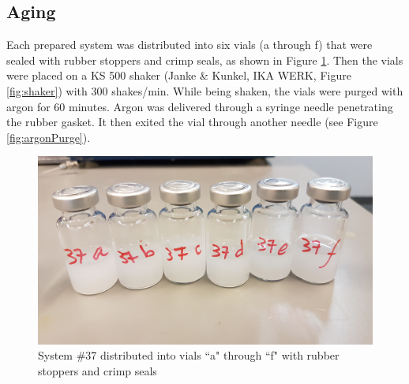 \subsection{Aging}
Each prepared system was distributed into six vials (a through f) that were sealed with rubber stoppers and crimp seals, as shown in Figure \ref{fig:vials}. Then the vials were placed on a KS 500 shaker (Janke \& Kunkel, IKA WERK, Figure \ref{fig:shaker}) with 300 shakes/min. While being shaken, the vials were purged with argon for 60 minutes. Argon was delivered through a syringe needle penetrating the rubber gasket. It then exited the vial through another needle (see Figure \ref{fig:argonPurge}).
\begin{figure}[p]
    \centering
    \includegraphics[width=.7\textwidth]{img/fig/vials.jpg}
    \caption{System \#37 distributed into vials ``a" through ``f" with rubber stoppers and crimp seals}
    \label{fig:vials}
\end{figure}
